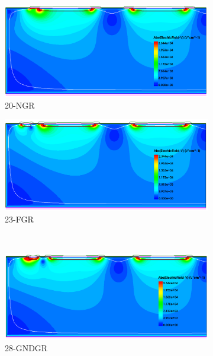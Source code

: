 \begin{figure}[htbp]
  \centering
  \begin{subfigure}[b]{0.5\textwidth}
    \includegraphics[width=\textwidth]{figures/ActiveEdge/Efield_20_NGR.png}
    \caption{20-NGR}
  \end{subfigure}\hfill
  \begin{subfigure}[b]{0.5\textwidth}
    \includegraphics[width=\textwidth]{figures/ActiveEdge/Efield_23_FGR.png}
    \caption{23-FGR}
  \end{subfigure} \\
  \begin{subfigure}[b]{0.5\textwidth}
    \includegraphics[width=\textwidth]{figures/ActiveEdge/Efield_28_GNDGR.png}
    \caption{28-GNDGR}
  \end{subfigure}\hfill
  \begin{subfigure}[b]{0.5\textwidth}

\end{subfigure}
\end{figure}
